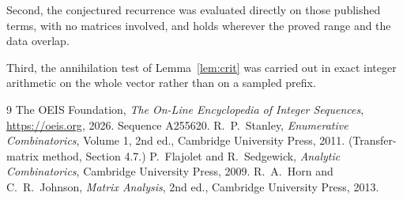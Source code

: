 \documentclass[11pt,a4paper]{article}
\theoremstyle{plain}
\theoremstyle{definition}
\begin{document}
Second, the conjectured recurrence was evaluated directly on those published terms, with no
matrices involved, and holds wherever the proved range and the data overlap.

Third, the annihilation test of Lemma~\ref{lem:crit} was carried out in exact integer
arithmetic on the whole vector rather than on a sampled prefix.

\begin{thebibliography}{9}
 The OEIS Foundation, \emph{The On-Line Encyclopedia of Integer
Sequences}, \url{https://oeis.org}, 2026. Sequence A255620.
 R.~P.~Stanley, \emph{Enumerative Combinatorics}, Volume 1, 2nd ed.,
Cambridge University Press, 2011. (Transfer-matrix method, Section 4.7.)
 P.~Flajolet and R.~Sedgewick, \emph{Analytic Combinatorics}, Cambridge
University Press, 2009.
 R.~A.~Horn and C.~R.~Johnson, \emph{Matrix Analysis}, 2nd ed., Cambridge
University Press, 2013.
\end{thebibliography}
\end{document}
